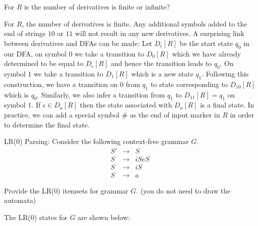 \documentclass[12pt]{article}
\begin{document}
\begin{exe}
\begin{xlist}
   \item For $R$ is the number of derivatives is finite or infinite?
   \begin{soln}
   For $R$, the number of derivatives is finite. Any additional symbols added to the end of
   strings $10$ or $11$ will not result in any new derivatives. A surprising link between derivatives
   and DFAs can be made: Let $D_\epsilon[R]$ be the start state $q_0$ in our DFA, 
   on symbol $0$ we take a transition to $D_0[R]$ which we have already determined to be 
   equal to $D_\epsilon[R]$ and hence the transition leads to $q_0$. On symbol $1$ we take
   a transition to $D_1[R]$ which is a new state $q_1$. Following this construction, 
   we have a transition on $0$ from $q_1$ to state corresponding to $D_{10}[R]$ which is 
   $q_0$. Similarly, we also infer a transition from $q_1$ to $D_{11}[R] = q_1$ on symbol $1$.
   If $\epsilon \in D_a[R]$ then the state associated with $D_a[R]$ is a final state.
   In practice, we can add a special symbol $\#$ as the end of input marker in $R$ in order
   to determine the final state.
   \end{soln}
   \end{xlist}
   
\bigskip

\newpage
\ex\label{ifelse} LR(0) Parsing: Consider the following context-free grammar $G$.
\setcounter{equation}{0}
\begin{eqnarray}
S' & \rightarrow & S \\
S  & \rightarrow & iSeS \\
S  & \rightarrow & iS \\
S  & \rightarrow & a
\end{eqnarray}

\begin{xlist}

{\ex Provide the LR(0) itemsets for grammar $G$. (you do not need to draw the automata)

\begin{soln}
The LR(0) states for $G$ are shown below:

\bigskip


\end{soln}}
\end{xlist}
\end{exe}
\end{document}
